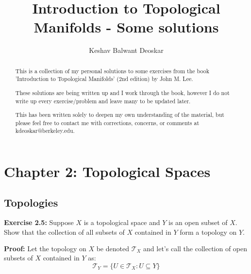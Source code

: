 \documentclass{article}
\title{Introduction to Topological Manifolds - Some solutions}
\author{Keshav Balwant Deoskar}
\begin{document}
\maketitle

\begin{abstract}
This is a collection of my personal solutions to some exercises from the book 'Introduction to Topological Manifolds' (2nd edition) by John M. Lee.

These solutions are being written up and I work through the book, however I do not write up every exercise/problem and leave many to be updated later.

This has been written solely to deepen my own understanding of the material, but please feel free to contact me with corrections, concerns, or comments at kdeoskar@berkeley.edu.
\end{abstract}


\tableofcontents

\pagebreak

\section{Chapter 2: Topological Spaces}
\vskip 0.5cm

\subsection{Topologies}

\vskip 0.5cm

\textbf{Exercise 2.5:} Suppose $X$ is a topological space and $Y$ is an open subset of $X$. Show that the collection of all subsets of $X$ contained in $Y$ form a topology on $Y$. 

\vskip 0.5cm

\textbf{Proof:}
Let the topology on $X$ be denoted $\mathcal T_X$ and let's call the collection of open subsets of $X$ contained in $Y$ as:
\[ \mathcal T_Y = \{ U \in \mathcal T_X : U \subseteq Y \} \]
\end{document}
